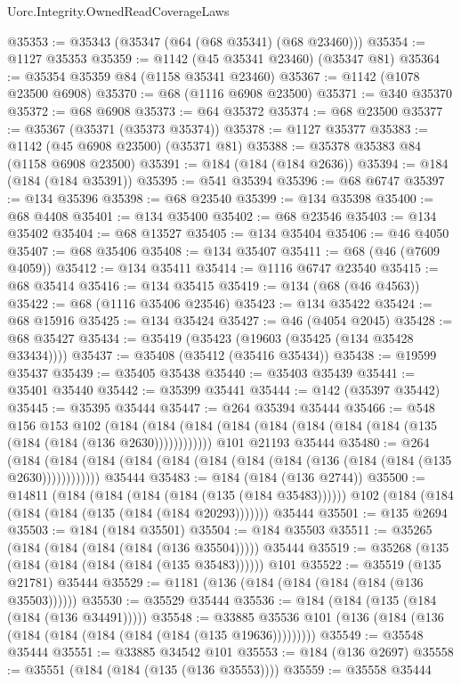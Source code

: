 \begin{lexlean}{Uorc.Integrity.OwnedReadCoverageLaws}
\begin{coremodule}
@35353 := @35343 (@35347 (@64 (@68 @35341) (@68 @23460)))
@35354 := @1127 @35353
@35359 := @1142 (@45 @35341 @23460) (@35347 @81)
@35364 := @35354 @35359 @84 (@1158 @35341 @23460)
@35367 := @1142 (@1078 @23500 @6908)
@35370 := @68 (@1116 @6908 @23500)
@35371 := @340 @35370
@35372 := @68 @6908
@35373 := @64 @35372
@35374 := @68 @23500
@35377 := @35367 (@35371 (@35373 @35374))
@35378 := @1127 @35377
@35383 := @1142 (@45 @6908 @23500) (@35371 @81)
@35388 := @35378 @35383 @84 (@1158 @6908 @23500)
@35391 := @184 (@184 (@184 @2636))
@35394 := @184 (@184 (@184 @35391))
@35395 := @541 @35394
@35396 := @68 @6747
@35397 := @134 @35396
@35398 := @68 @23540
@35399 := @134 @35398
@35400 := @68 @4408
@35401 := @134 @35400
@35402 := @68 @23546
@35403 := @134 @35402
@35404 := @68 @13527
@35405 := @134 @35404
@35406 := @46 @4050
@35407 := @68 @35406
@35408 := @134 @35407
@35411 := @68 (@46 (@7609 @4059))
@35412 := @134 @35411
@35414 := @1116 @6747 @23540
@35415 := @68 @35414
@35416 := @134 @35415
@35419 := @134 (@68 (@46 @4563))
@35422 := @68 (@1116 @35406 @23546)
@35423 := @134 @35422
@35424 := @68 @15916
@35425 := @134 @35424
@35427 := @46 (@4054 @2045)
@35428 := @68 @35427
@35434 := @35419 (@35423 (@19603 (@35425 (@134 @35428 @33434))))
@35437 := @35408 (@35412 (@35416 @35434))
@35438 := @19599 @35437
@35439 := @35405 @35438
@35440 := @35403 @35439
@35441 := @35401 @35440
@35442 := @35399 @35441
@35444 := @142 (@35397 @35442)
@35445 := @35395 @35444
@35447 := @264 @35394 @35444
@35466 := @548
    @156
    @153
    @102
    (@184 (@184 (@184 (@184 (@184 (@184 (@184 (@184 (@135 (@184 (@184 (@136 @2630))))))))))))
    @101
    @21193
    @35444
@35480 := @264
    (@184 (@184 (@184 (@184 (@184 (@184 (@184 (@184 (@136 (@184 (@184 (@135 @2630))))))))))))
    @35444
@35483 := @184 (@184 (@136 @2744))
@35500 := @14811
    (@184 (@184 (@184 (@184 (@135 (@184 @35483))))))
    @102
    (@184 (@184 (@184 (@184 (@135 (@184 (@184 @20293)))))))
    @35444
@35501 := @135 @2694
@35503 := @184 (@184 @35501)
@35504 := @184 @35503
@35511 := @35265 (@184 (@184 (@184 (@184 (@136 @35504))))) @35444
@35519 := @35268 (@135 (@184 (@184 (@184 (@184 (@135 @35483)))))) @101
@35522 := @35519 (@135 @21781) @35444
@35529 := @1181 (@136 (@184 (@184 (@184 (@184 (@136 @35503))))))
@35530 := @35529 @35444
@35536 := @184 (@184 (@135 (@184 (@184 (@136 @34491)))))
@35548 := @33885 @35536 @101 (@136 (@184 (@136 (@184 (@184 (@184 (@184 (@184 (@135 @19636)))))))))
@35549 := @35548 @35444
@35551 := @33885 @34542 @101
@35553 := @184 (@136 @2697)
@35558 := @35551 (@184 (@184 (@135 (@136 @35553))))
@35559 := @35558 @35444

\end{coremodule}
\end{lexlean}
